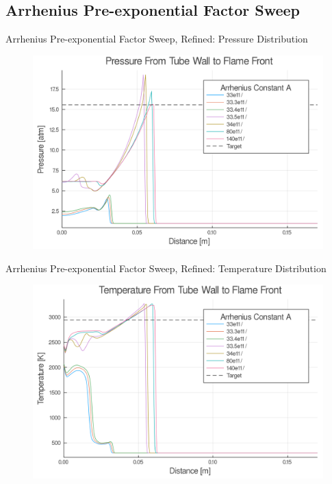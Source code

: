 \subsection{Arrhenius Pre-exponential Factor Sweep}
\begin{frame}{Arrhenius Pre-exponential Factor Sweep, Refined: Pressure Distribution}
\begin{figure}
\centering
\includegraphics[width=0.8\linewidth]{../figs/Atest_refined/p.png}
\end{figure}
\end{frame}

\begin{frame}{Arrhenius Pre-exponential Factor Sweep, Refined: Temperature Distribution}
\begin{figure}
\centering
\includegraphics[width=0.8\linewidth]{../figs/Atest_refined/t.png}
\end{figure}
\end{frame}

